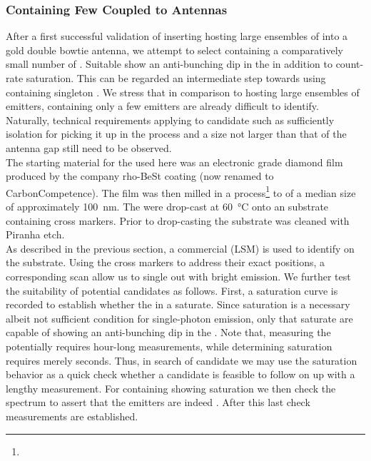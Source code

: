 		\subsubsection{\Nds Containing Few \sivs Coupled to Antennas} \label{subsubsec::antenna_single_siv}

				After a first successful validation of inserting \nds hosting large ensembles of \sivs into a gold double bowtie antenna, we attempt to select \nds containing a comparatively small number of \sivs. Suitable \nds show an anti-bunching dip in the \gtf in addition to count-rate saturation. This can be regarded an intermediate step towards using \nds containing singleton \sivs. We stress that in comparison to \nds hosting large ensembles of emitters, \nds containing only a few emitters are already difficult to identify. Naturally, technical requirements applying to candidate \nds such as sufficiently isolation for picking it up in the \pp process and a size not larger than that of the antenna gap still need to be observed.
				\\
				The starting material for the \nds used here was an electronic grade diamond film produced by the company rho-BeSt coating (now renamed to CarbonCompetence).
				The film was then milled in a \basd process\footnote{\krueger} to \nds of a median size of approximately \SI{100}{nm}.
				The \nds were drop-cast at \SI{60}{\celsius} onto an \ir substrate containing cross markers. Prior to drop-casting the substrate was cleaned with Piranha etch.
				\\
				As described in the previous section, a commercial \lsm (LSM) is used to identify \nds on the substrate. Using the cross markers to address their exact positions, a corresponding \fl scan allow us to single out \nds with bright emission. We further test the suitability of potential candidates as follows. First, a saturation curve is recorded to establish whether the \sivs in a \nd saturate. Since saturation is a necessary albeit not sufficient condition for single-photon emission, only \nds that saturate are capable of showing an anti-bunching dip in the \gtf. Note that, measuring the \gtf potentially requires hour-long measurements, while determining saturation requires merely seconds. Thus, in search of candidate \nds we may use the saturation behavior as a quick check whether a candidate is feasible to follow on up with a lengthy \gtf measurement. For \nds containing \sivs showing saturation we then check the spectrum to assert that the emitters are indeed \sivs. After this last check \gtf measurements are established.
